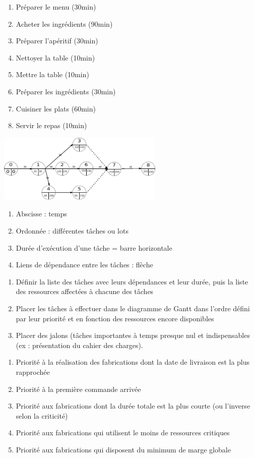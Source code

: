 \begin{enumerate}
	\item Préparer le menu (30min)
	\item Acheter les ingrédients (90min)
	\item Préparer l'apéritif (30min)
	\item Nettoyer la table (10min)
	\item Mettre la table (10min)
	\item Préparer les ingrédients (30min)
	\item Cuisiner les plats (60min)
	\item Servir le repas (10min)
\end{enumerate}
\includegraphics[width=300px]{Images/fig2.pdf}
\\

\begin{enumerate}
	\item Abscisse : temps
	\item Ordonnée : différentes tâches ou lots
	\item Durée d'exécution d'une tâche = barre horizontale
	\item Liens de dépendance entre les tâches : flèche
\end{enumerate}

\begin{enumerate}
	\item Définir la liste des tâches avec leurs dépendances et leur durée, puis la liste des ressources affectées à chacune des tâches
	\item Placer les tâches à effectuer dans le diagramme de Gantt dans l'ordre défini par leur priorité et en fonction des ressources encore disponibles
	\item Placer des jalons (tâches importantes à temps presque nul et indispensables (ex : présentation du cahier des charges).
\end{enumerate}

\begin{enumerate}
	\item Priorité à la réalisation des fabrications dont la date de livraison est la plus rapprochée
	\item Priorité à la première commande arrivée
	\item Priorité aux fabrications dont la durée totale est la plus courte (ou l'inverse selon la criticité)
	\item Priorité aux fabrications qui utilisent le moins de ressources critiques
	\item Priorité aux fabrications qui disposent du minimum de marge globale
\end{enumerate}

